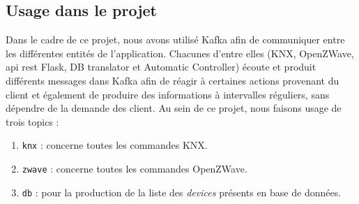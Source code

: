\subsection{Usage dans le projet}
Dans le cadre de ce projet, nous avons utilisé Kafka afin de communiquer entre les différentes entités de l'application.
Chacunes d'entre elles (KNX, OpenZWave, \acrshort{api} \acrshort{rest} Flask, DB translator et Automatic Controller) écoute et produit différents messages dans Kafka afin de réagir à certaines actions provenant du client et également de produire des informations à intervalles réguliers, sans dépendre de la demande des client. Au sein de ce projet, nous faisons usage de trois topics : 
\begin{enumerate}
    \item \texttt{knx} : concerne toutes les commandes KNX.
    \item \texttt{zwave} : concerne toutes les commandes OpenZWave.
    \item \texttt{db} : pour la production de la liste des \textit{devices} présents en base de données.
\end{enumerate}

